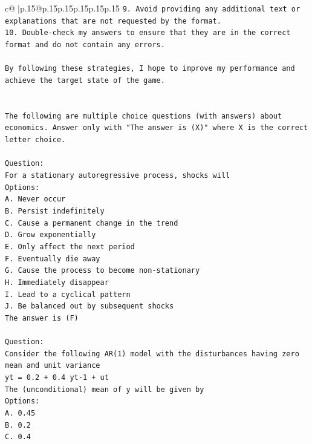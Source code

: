 \documentclass{article}
\begin{document}
{\begin{supertabular}{c@{$\;$}|p{.15\linewidth}@{}p{.15\linewidth}p{.15\linewidth}p{.15\linewidth}p{.15\linewidth}p{.15\linewidth}}
{{{\texttt{9. Avoid providing any additional text or explanations that are not requested by the format.} \\
\texttt{10. Double{-}check my answers to ensure that they are in the correct format and do not contain any errors.} \\
\\ 
\texttt{By following these strategies, I hope to improve my performance and achieve the target state of the game.} \\
\\ 
\\ 
\texttt{The following are multiple choice questions (with answers) about economics. Answer only with "The answer is (X)" where X is the correct letter choice.} \\
\\ 
\texttt{Question:} \\
\texttt{For a stationary autoregressive process, shocks will} \\
\texttt{Options:} \\
\texttt{A. Never occur} \\
\texttt{B. Persist indefinitely} \\
\texttt{C. Cause a permanent change in the trend} \\
\texttt{D. Grow exponentially} \\
\texttt{E. Only affect the next period} \\
\texttt{F. Eventually die away} \\
\texttt{G. Cause the process to become non{-}stationary} \\
\texttt{H. Immediately disappear} \\
\texttt{I. Lead to a cyclical pattern} \\
\texttt{J. Be balanced out by subsequent shocks} \\
\texttt{The answer is (F)} \\
\\ 
\texttt{Question:} \\
\texttt{Consider the following AR(1) model with the disturbances having zero mean and unit variance} \\
\texttt{yt = 0.2 + 0.4 yt{-}1 + ut} \\
\texttt{The (unconditional) mean of y will be given by} \\
\texttt{Options:} \\
\texttt{A. 0.45} \\
\texttt{B. 0.2} \\
\texttt{C. 0.4} \\
}}}
\end{supertabular}}
\end{document}
